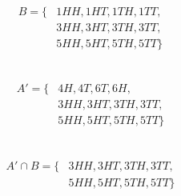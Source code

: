 \documentclass{article}
\begin{document}
            \paragraph{
                \begin{equation*}
                    \begin{split}
                        B=\{& 1HH,1HT,1TH,1TT,\\
                            &3HH,3HT,3TH,3TT,\\
                            &5HH,5HT,5TH,5TT\}\\
                    \end{split}
                \end{equation*}
            }
        \subsection{}
            \paragraph{
                \begin{equation*}
                    \begin{split}
                        A'=\{& 4H,4T,6T,6H,\\
                            &3HH,3HT,3TH,3TT,\\
                            &5HH,5HT,5TH,5TT\}\\
                    \end{split}
                \end{equation*}
            }
        \subsection{}
            \paragraph{
                \begin{equation*}
                    \begin{split}
                        A'\cap B =\{&3HH,3HT,3TH,3TT,\\
                            &5HH,5HT,5TH,5TT\}\\
                    \end{split}
                \end{equation*}
            }
        \subsection{}
\end{document}
